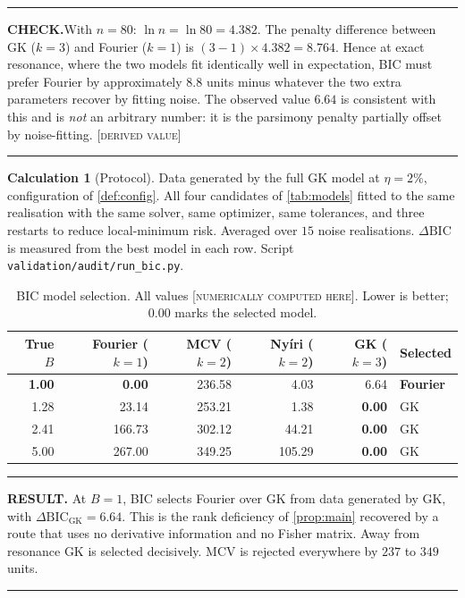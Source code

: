 \documentclass[11pt,a4paper]{article}
\theoremstyle{definition}
\newtheorem{calculationx}{Calculation}[section]
\newenvironment{checkbox}%
  {\par\medskip\noindent\begin{minipage}{\linewidth}%
   \rule{\linewidth}{0.4pt}\par\noindent\textbf{CHECK.}\enspace}%
  {\par\rule{\linewidth}{0.4pt}\end{minipage}\par\medskip}
\newenvironment{resultbox}%
  {\par\medskip\noindent\begin{minipage}{\linewidth}%
   \rule{\linewidth}{1.0pt}\par\noindent\textbf{RESULT.}\enspace}%
  {\par\rule{\linewidth}{1.0pt}\end{minipage}\par\medskip}
\newcommand{\DER}{\textcolor{green!35!black}{\footnotesize[\textsc{derived value}]}}
\newcommand{\NUM}{\textcolor{red!55!black}{\footnotesize[\textsc{numerically computed here}]}}
\newcommand{\Bnum}{B}
\begin{document}
\begin{checkbox}[Verification of the convention]
With $n=80$: $\ln n = \ln 80 = 4.382$. The penalty difference between GK
($k=3$) and Fourier ($k=1$) is $(3-1)\times4.382 = 8.764$. Hence at exact
resonance, where the two models fit identically well in expectation, BIC must
prefer Fourier by approximately $8.8$ units minus whatever the two extra
parameters recover by fitting noise. The observed value $6.64$ is consistent
with this and is \emph{not} an arbitrary number: it is the parsimony penalty
partially offset by noise-fitting. \DER
\end{checkbox}

\begin{calculationx}[Protocol]
\label{calc:bic}
Data generated by the full GK model at $\eta=2\%$, configuration of
\cref{def:config}. All four candidates of \cref{tab:models} fitted to the same
realisation with the same solver, same optimizer, same tolerances, and three
restarts to reduce local-minimum risk. Averaged over $15$ noise realisations.
$\Delta\mathrm{BIC}$ is measured from the best model in each row.
Script \texttt{validation/audit/run\_bic.py}.
\end{calculationx}

\begin{table}[H]
\centering
\caption{BIC model selection. All values \NUM. Lower is better; $0.00$ marks
         the selected model.}
\label{tab:bic}
\small
\begin{tabular}{@{}rrrrrl@{}}
\toprule
True $\Bnum$ & Fourier ($k{=}1$) & MCV ($k{=}2$) &
Nyíri ($k{=}2$) & GK ($k{=}3$) & Selected \\
\midrule
\textbf{1.00} & \textbf{0.00} & 236.58 & 4.03 & 6.64 &
  \textbf{Fourier} \\
1.28 & 23.14  & 253.21 & 1.38   & \textbf{0.00} & GK \\
2.41 & 166.73 & 302.12 & 44.21  & \textbf{0.00} & GK \\
5.00 & 267.00 & 349.25 & 105.29 & \textbf{0.00} & GK \\
\bottomrule
\end{tabular}
\end{table}

\begin{resultbox}
At $\Bnum=1$, BIC selects Fourier over GK from data generated by GK, with
$\Delta\mathrm{BIC}_{\text{GK}}=6.64$. This is the rank deficiency of
\cref{prop:main} recovered by a route that uses no derivative information and
no Fisher matrix. Away from resonance GK is selected decisively. MCV is
rejected everywhere by $237$ to $349$ units.
\end{resultbox}
\end{document}
